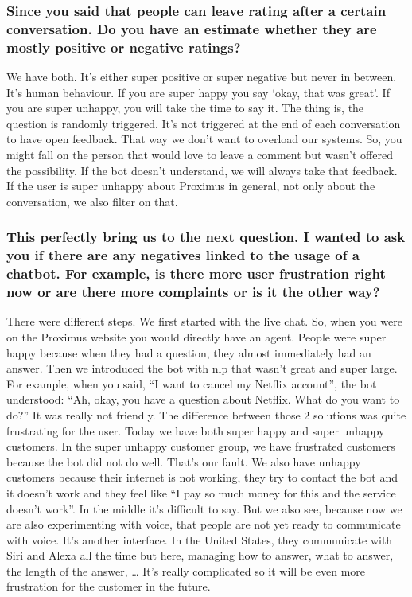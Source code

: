 \begin{appendices}
	\subsubsection{Since you said that people can leave rating after a certain conversation. Do you have an estimate whether they are mostly positive or negative ratings?}
	We have both. It’s either super positive or super negative but never in between. It’s human behaviour. If you are super happy you say ‘okay, that was great’. If you are super unhappy, you will take the time to say it. The thing is, the question is randomly triggered. It’s not triggered at the end of each conversation to have open feedback. That way we don’t want to overload our systems. So, you might fall on the person that would love to leave a comment but wasn’t offered the possibility.
	If the bot doesn’t understand, we will always take that feedback. If the user is super unhappy about Proximus in general, not only about the conversation, we also filter on that.
	
	\subsubsection{This perfectly bring us to the next question. I wanted to ask you if there are any negatives linked to the usage of a chatbot. For example, is there more user frustration right now or are there more complaints or is it the other way?}
	There were different steps. We first started with the live chat. So, when you were on the Proximus website you would directly have an agent. People were super happy because when they had a question, they almost immediately had an answer. Then we introduced the bot with \acrshort{nlp} that wasn’t great and super large. For example, when you said, “I want to cancel my Netflix account”, the bot understood: “Ah, okay, you have a question about Netflix. What do you want to do?” It was really not friendly. The difference between those 2 solutions was quite frustrating for the user. Today we have both super happy and super unhappy customers. In the super unhappy customer group, we have frustrated customers because the bot did not do well. That’s our fault. We also have unhappy customers because their internet is not working, they try to contact the bot and it doesn’t work and they feel like “I pay so much money for this and the service doesn’t work”. In the middle it’s difficult to say. But we also see, because now we are also experimenting with voice, that people are not yet ready to communicate with voice. It’s another interface. In the United States, they communicate with Siri and Alexa all the time but here, managing how to answer, what to answer, the length of the answer, … It’s really complicated so it will be even more frustration for the customer in the future.
	

\end{appendices}
